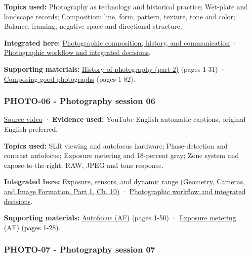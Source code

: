 \textbf{Topics used:} Photography as technology and historical practice; Wet-plate and landscape records; Composition: line, form, pattern, texture, tone and color; Balance, framing, negative space and directional structure.

\textbf{Integrated here:} \hyperref[04-visual-computing-ii-ch034-photographic-composition-history-and-communication]{Photographic composition, history, and communication} · \hyperref[04-visual-computing-ii-ch034-photographic-workflow-and-integrated-decisions]{Photographic workflow and integrated decisions}.

\textbf{Supporting materials:} \href{https://drive.google.com/open?id=0B6w2XfPHEcZYNm5MczhBTkxsanc}{History of photography (part 2)} (pages 1-31) · \href{https://drive.google.com/file/d/0B6w2XfPHEcZYSkZXWG9mSGpFMVk/view?usp=sharing}{Composing good photographs} (pages 1-82).

\subsubsection{PHOTO-06 - Photography session 06}\label{04-visual-computing-ii-ch036-photo-06---photography-session-06}

\hypertarget{04-visual-computing-ii-ch036-photo-06---photography-session-06}{}

\href{https://www.youtube.com/watch?v=njlDb9-6aOU}{Source video} · \textbf{Evidence used:} YouTube English automatic captions, original English preferred.

\textbf{Topics used:} SLR viewing and autofocus hardware; Phase-detection and contrast autofocus; Exposure metering and 18-percent gray; Zone system and expose-to-the-right; RAW, JPEG and tone response.

\textbf{Integrated here:} \href{../03-Geometry-Cameras-and-Image-Formation-P01/main.pdf\#nameddest=03-visual-computing-i-ch003-exposure-sensors-and-dynamic-range}{Exposure, sensors, and dynamic range (Geometry, Cameras, and Image Formation, Part 1, Ch. 10)} · \hyperref[04-visual-computing-ii-ch034-photographic-workflow-and-integrated-decisions]{Photographic workflow and integrated decisions}.

\textbf{Supporting materials:} \href{https://drive.google.com/open?id=0B6w2XfPHEcZYQnR3SG43Z2VIRmM}{Autofocus (AF)} (pages 1-50) · \href{https://drive.google.com/open?id=0B6w2XfPHEcZYbG9EWlhacm80SFE}{Exposure metering (AE)} (pages 1-28).

\subsubsection{PHOTO-07 - Photography session 07}\label{04-visual-computing-ii-ch036-photo-07---photography-session-07}

